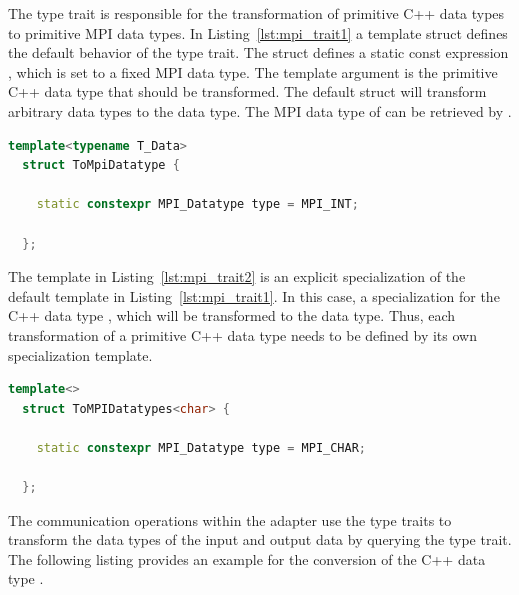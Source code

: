 The type trait is responsible for the transformation of primitive C++
data types to primitive MPI data types.  In
Listing~\ref{lst:mpi_trait1} a template struct defines the default
behavior of the type trait. The struct defines a static const
expression , which is set to a fixed MPI data type. The
template argument  is the primitive C++ data type that
should be transformed. The default struct will transform arbitrary
data types  to the  data type. The MPI data
type of  can be retrieved by
.

\begin{minipage}[t]{\textwidth} 
\begin{lstlisting}[language=C++, label=lst:mpi_trait1, caption={A templated struct defines the default behavior of the type trait. It will transform arbitrary data types \cpp{T\_Data} to the MPI\_INT data type if no other type trait is defined}]
  template<typename T_Data> 
  struct ToMpiDatatype { 

    static constexpr MPI_Datatype type = MPI_INT; 

  };
\end{lstlisting}
\end{minipage}

\noindent The template in Listing~\ref{lst:mpi_trait2} is an explicit
specialization of the default template in
Listing~\ref{lst:mpi_trait1}. In this case, a specialization for the
C++ data type , which will be transformed to the
 data type.  Thus, each transformation of a primitive
C++ data type needs to be defined by its own specialization template.

\begin{minipage}[t]{\textwidth} 
  \begin{lstlisting}[language=C++, label=lst:mpi_trait2, caption={A specialization of the default type trait for the C++ data type \cpp{char}. It transforms \cpp{char} to the \cpp{MPI\_CHAR} data type.}]
  template<>
  struct ToMPIDatatypes<char> { 

    static constexpr MPI_Datatype type = MPI_CHAR; 

  };
\end{lstlisting}
\end{minipage}

\noindent The communication operations within the adapter use the
type traits to transform the data types of the input and output data
by querying the type trait. The following listing provides an example
for the conversion of the C++ data type .

